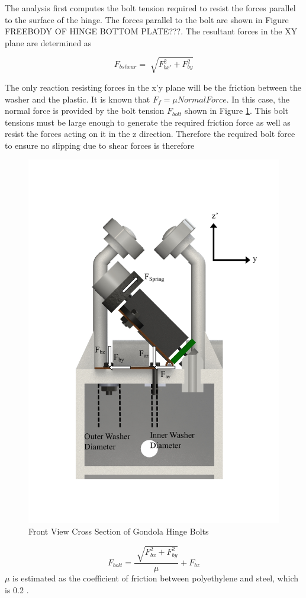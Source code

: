 \documentclass[../main.tex]{subfiles}
\begin{document}
The analysis first computes the bolt tension required to resist the forces parallel to the surface of the hinge. The forces parallel to the bolt are shown in Figure FREEBODY OF HINGE BOTTOM PLATE???. The resultant forces in the XY plane are determined as 

\begin{displaymath}
F_{bshear} = \sqrt[]{F_{bx'}^2 + F_{by}^2}
\end{displaymath}

The only reaction resisting forces in the x'y plane will be the friction between the washer and the plastic. It is known that $F_f = \mu Normal Force$. In this case, the normal force is provided by the bolt tension $F_{bolt}$ shown in Figure \ref{fig:boltCrossSection}. This bolt tensions must be large enough to generate the required friction force as well as resist the forces acting on it in the z direction. Therefore the required bolt force to ensure no slipping due to shear forces is therefore
\begin{figure}[H]
	\centering
	\includegraphics[width=1\textwidth]{img/gondola/boltCrossSection.pdf}
	\caption{Front View Cross Section of Gondola Hinge Bolts}
	\label{fig:boltCrossSection}
\end{figure}
\begin{equation}
F_{bolt} = \dfrac{\sqrt[]{F_{bx}^2 + F_{by}^2}}{\mu} + F_{bz}
\end{equation}
$\mu $ is estimated as the coefficient of friction between polyethylene and steel, which is 0.2 \cite{Friction}. \\
\end{document}
